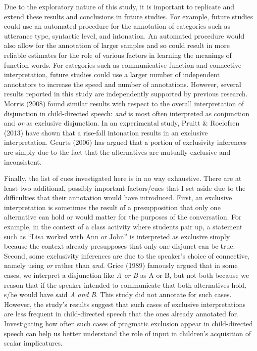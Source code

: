 \documentclass[oneside]{report}
\theoremstyle{definition}
\theoremstyle{definition}
\theoremstyle{definition}
\theoremstyle{remark}
\begin{document}
Due to the exploratory nature of this study, it is important to
replicate and extend these results and conclusions in future studies.
For example, future studies could use an automated procedure for the
annotation of categories such as utterance type, syntactic level, and
intonation. An automated procedure would also allow for the annotation
of larger samples and so could result in more reliable estimates for the
role of various factors in learning the meanings of function words. For
categories such as communicative function and connective interpretation,
future studies could use a larger number of independent annotators to
increase the speed and number of annotations. However, several results
reported in this study are independently supported by previous research.
Morris (2008) found similar results with respect to the overall
interpretation of disjunction in child-directed speech: \emph{and} is
most often interpreted as conjunction and \emph{or} as exclusive
disjunction. In an experimental study, Pruitt \& Roelofsen (2013) have
shown that a rise-fall intonation results in an exclusive
interpretation. Geurts (2006) has argued that a portion of exclusivity
inferences are simply due to the fact that the alternatives are mutually
exclusive and inconsistent.

Finally, the list of cues investigated here is in no way exhaustive.
There are at least two additional, possibly important factors/cues that
I set aside due to the difficulties that their annotation would have
introduced. First, an exclusive interpretation is sometimes the result
of a presupposition that only one alternative can hold or would matter
for the purposes of the conversation. For example, in the context of a
class activity where students pair up, a statement such as ``Lisa worked
with Ann or John'' is interpreted as exclusive simply because the
context already presupposes that only one disjunct can be true. Second,
some exclusivity inferences are due to the speaker's choice of
connective, namely using \emph{or} rather than \emph{and}. Grice (1989)
famously argued that in some cases, we interpret a disjunction like
\emph{A or B} as A or B, but not both because we reason that if the
speaker intended to communicate that both alternatives hold, s/he would
have said \emph{A and B}. This study did not annotate for such cases.
However, the study's results suggest that such cases of exclusive
interpretations are less frequent in child-directed speech that the ones
already annotated for. Investigating how often such cases of pragmatic
exclusion appear in child-directed speech can help us better understand
the role of input in children's acquisition of scalar implicatures.
\end{document}
